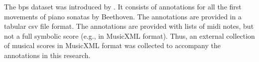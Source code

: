 

The \gls{bps} dataset was introduced by
\textcite{chen2018functional}. It consists of annotations
for all the first movements of piano sonatas by Beethoven.
The annotations are provided in a tabular \gls{csv} file
format. The annotations are provided with lists of midi
notes, but not a full symbolic score (e.g., in MusicXML
format). Thus, an external collection of musical scores in
MusicXML format was collected to accompany the annotations
in this research.